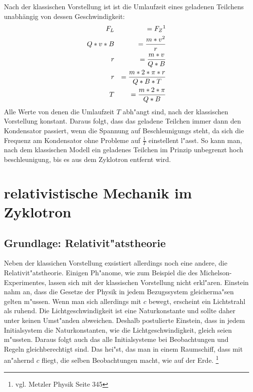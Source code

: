 \documentclass[14pt, a4paper]{report}
\begin{document}
Nach der klassischen Vorstellung ist ist die Umlaufzeit eines geladenen Teilchens 
unabhängig von dessen Geschwindigkeit:
\begin{eqnarray}
  F_L  		&& = F_Z  \footnotemark  \\
  Q * v * B 	&& = \frac{m * v^2}{r} \label{Radius im Zyklotron}\\
  r		&& = \frac{m * v}{Q * B} \\
  r		&& = \frac{m * 2 * \pi * r}{Q * B * T} \\
  T		&& = \frac{m * 2 * \pi }{Q * B} \label{klassische_Umlaufzeit}
\end{eqnarray}
Alle Werte von denen die Umlaufzeit $T$ abh"angt sind, nach der klassischen Vorstellung
konstant. Daraus folgt, dass das geladene Teilchen immer dann den Kondensator passiert,
wenn die Spannung auf Beschleunigungs steht, da sich die Frequenz am Kondensator ohne
Probleme auf $\frac{1}{T}$ einstellent l"asst. So kann man, nach dem klassischen Modell
ein geladenes Teilchen im Prinzip unbegrenzt hoch beschleunigung, bis es aus dem
Zyklotron entfernt wird. \label{klassische_Erwartung}

\chapter{relativistische Mechanik im Zyklotron}
\section{Grundlage: Relativit"atstheorie}
Neben der klassichen Vorstellung exsistiert allerdings noch eine andere, die 
Relativit"atstheorie. Einigen Ph"anome, wie zum Beispiel die des Michelson-Experimentes,
lassen sich mit der klassischen Vorstellung nicht erkl"aren. Einstein nahm an, dass 
die Gesetze der Physik in jedem Bezugssystem gleicherma"sen gelten m"ussen. 
Wenn man sich allerdings mit $c$ bewegt, erscheint ein Lichtstrahl als ruhend. 
Die Lichtgeschwindigkeit ist eine Naturkonstante und sollte daher unter keinen 
Umst"anden abweichen. Deshalb postulierte Einstein, dass in jedem Initialsystem die 
Naturkonstanten, wie die Lichtgeschwindigkeit, gleich seien m"ussten. Daraus folgt auch
das alle Initialsysteme bei Beobachtungen und Regeln gleichberechtigt sind. Das hei"st,
das man in einem Raumschiff, dass mit an"ahernd $c$ fliegt, die selben Beobachtungen 
macht, wie auf der Erde.
\footnote{vgl. Metzler Physik Seite 345}
\end{document}

